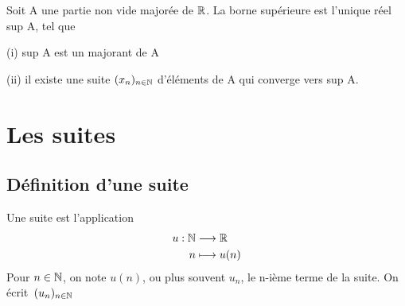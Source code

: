 \documentclass[a4paper, 12pt]{article}
\begin{document}
\begin{proposition}
    Soit A une partie non vide majorée de $\mathbb{R}$. La borne supérieure est l'unique réel sup A, tel que

    \item (i) sup A est un majorant de A
    \item (ii) il existe une suite $(x_n)_{n \in \mathbb{N}}$ d'éléments de A qui converge vers sup A.
\end{proposition}

\section{Les suites}

\subsection{Définition d'une suite}

\begin{definition}
    Une suite est l'application
    \begin{align*}
        u: \mathbb{N} &\longrightarrow \mathbb{R}\\
        n &\longmapsto u(n)
    \end{align*}
    Pour $n \in \mathbb{N}$, on note $u(n)$, ou plus souvent $u_n$, le n-ième terme de la suite.
    On écrit~$(u_n)_{n \in \mathbb{N}}$
\end{definition}
\end{document}
